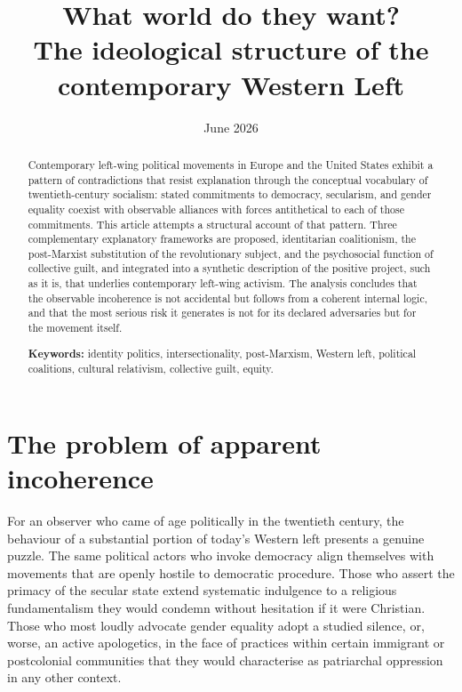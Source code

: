 \documentclass[12pt,a4paper]{article}
\begin{document}
	
	\title{What world do they want?\\
		\large The ideological structure of the contemporary Western Left}
	\date{June 2026}
	\maketitle
	
	\begin{abstract}
		\noindent
		Contemporary left-wing political movements in Europe and the United States exhibit
		a pattern of contradictions that resist explanation through the conceptual vocabulary
		of twentieth-century socialism: stated commitments to democracy, secularism, and
		gender equality coexist with observable alliances with forces antithetical to each of
		those commitments. This article attempts a structural account of that pattern. Three
		complementary explanatory frameworks are proposed, identitarian coalitionism, the
		post-Marxist substitution of the revolutionary subject, and the psychosocial function
		of collective guilt, and integrated into a synthetic description of the positive
		project, such as it is, that underlies contemporary left-wing activism. The analysis
		concludes that the observable incoherence is not accidental but follows from a
		coherent internal logic, and that the most serious risk it generates is not for its
		declared adversaries but for the movement itself.
		
		\medskip
		\noindent\textbf{Keywords:} identity politics, intersectionality, post-Marxism,
		Western left, political coalitions, cultural relativism, collective guilt, equity.
	\end{abstract}
	
	\section{The problem of apparent incoherence}
	
	For an observer who came of age politically in the twentieth century, the behaviour
	of a substantial portion of today's Western left presents a genuine puzzle. The
	same political actors who invoke democracy align themselves with movements that
	are openly hostile to democratic procedure. Those who assert the primacy of the
	secular state extend systematic indulgence to a religious fundamentalism they would
	condemn without hesitation if it were Christian. Those who most loudly advocate
	gender equality adopt a studied silence, or, worse, an active apologetics, in the
	face of practices within certain immigrant or postcolonial communities that they
	would characterise as patriarchal oppression in any other context.
	
\end{document}
